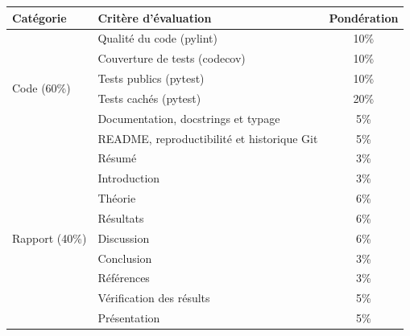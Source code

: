 \documentclass[12pt, letterpaper]{article}
\begin{document}
\begin{tabular}{l l c}
	\toprule
	\textbf{Catégorie} & \textbf{Critère d’évaluation}              & \textbf{Pondération} \\
	\midrule
	\multirow{6}{*}{Code (60\%)}
	                   & Qualité du code (pylint)                   & 10\%                 \\
	                   & Couverture de tests (codecov)              & 10\%                 \\
	                   & Tests publics (pytest)                     & 10\%                 \\
	                   & Tests cachés (pytest)                      & 20\%                 \\
	                   & Documentation, docstrings et typage        & 5\%                  \\
	                   & README, reproductibilité et historique Git & 5\%                  \\
	\midrule
	\multirow{9}{*}{Rapport (40\%)}
	                   & Résumé                                     & 3\%                  \\
	                   & Introduction                               & 3\%                  \\
	                   & Théorie                                    & 6\%                  \\
	                   & Résultats                                  & 6\%                  \\
	                   & Discussion                                 & 6\%                  \\
	                   & Conclusion                                 & 3\%                  \\
	                   & Références                                 & 3\%                  \\
	                   & Vérification des résults                   & 5\%                  \\
	                   & Présentation                               & 5\%                  \\
	\bottomrule
\end{tabular}
\end{document}
